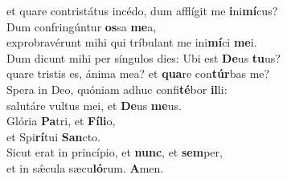 \oddverse et quare contristátus incédo, dum afflígit me \textbf{i}ni\textbf{mí}cus?\\
\evenverse Dum confringúntur \textbf{os}sa \textbf{me}a,~\*\\
\evenverse exprobravérunt mihi qui tríbulant me ini\textbf{mí}ci \textbf{me}i.\\
\oddverse Dum dicunt mihi per síngulos dies: Ubi est \textbf{De}us \textbf{tu}us?~\*\\
\oddverse quare tristis es, ánima mea? et \textbf{qua}re con\textbf{túr}bas me?\\
\evenverse Spera in Deo, quóniam adhuc confi\textbf{té}bor \textbf{il}li:~\*\\
\evenverse salutáre vultus mei, et \textbf{De}us \textbf{me}us.\\
\oddverse Glória \textbf{Pa}tri, et \textbf{Fí}\textbf{li}o,~\*\\
\oddverse et Spi\textbf{rí}tui \textbf{San}cto.\\
\evenverse Sicut erat in princípio, et \textbf{nunc}, et \textbf{sem}per,~\*\\
\evenverse et in sǽcula sæcu\textbf{ló}rum. \textbf{A}men.\\
